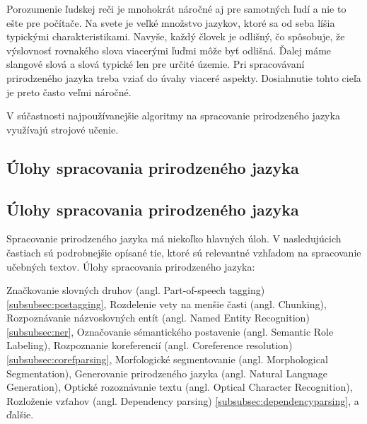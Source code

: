 Porozumenie ľudskej reči je mnohokrát náročné aj pre samotných ľudí a nie to ešte pre počítače. Na svete je veľké množstvo jazykov, ktoré sa od seba líšia typickými charakteristikami. Navyše, každý človek je odlišný, čo spôsobuje, že výslovnosť rovnakého slova viacerými ľuďmi môže byť odlišná. Ďalej máme slangové slová a slová typické len pre určité územie. Pri spracovávaní prirodzeného jazyka treba vziať do úvahy viaceré aspekty. Dosiahnutie tohto cieľa je preto často veľmi náročné.

V súčastnosti najpoužívanejšie algoritmy na spracovanie prirodzeného jazyka využívajú strojové učenie.


%
%
{
	\subsection{Úlohy spracovania prirodzeného jazyka}
}
{
	\subsection{Úlohy spracovania prirodzeného jazyka}
}
\label{subsec:tasksofnlp}
Spracovanie prirodzeného jazyka má niekoľko hlavných úloh. V nasledujúcich častiach sú podrobnejšie opísané tie, ktoré sú relevantné vzhľadom na spracovanie učebných textov.
Úlohy spracovania prirodzeného jazyka:~\cite{collobert2011} 
\begin{my_itemize}
	\myitem Značkovanie slovných druhov (angl. Part-of-speech tagging) \ref{subsubsec:postagging},
	\myitem Rozdelenie vety na menšie časti (angl. Chunking),
	\myitem Rozpoznávanie názvoslovných entít (angl. Named Entity Recognition) \ref{subsubsec:ner},
	\myitem Označovanie sémantického postavenie (angl. Semantic Role Labeling),
	\myitem Rozpoznanie koreferencií (angl. Coreference resolution) \ref{subsubsec:corefparsing},
	\myitem Morfologické segmentovanie (angl. Morphological Segmentation),
	\myitem Generovanie prirodzeného jazyka (angl. Natural Language Generation),
	\myitem Optické rozoznávanie textu (angl. Optical Character Recognition),
	\myitem Rozloženie vzťahov (angl. Dependency parsing) \ref{subsubsec:dependencyparsing},
	\myitem a ďalšie.
\end{my_itemize}

